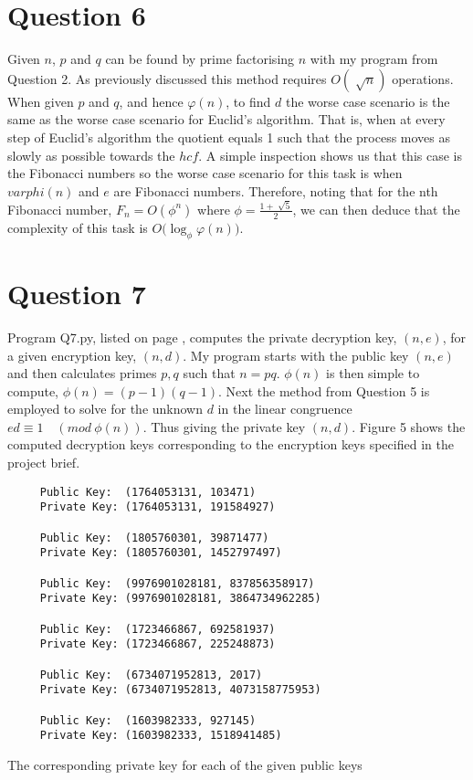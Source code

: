 \documentclass[a4paper]{article}
\begin{document}
\section*{Question 6}
Given $n$, $p$ and $q$ can be found by prime factorising $n$ with my program from Question 2. As previously discussed this method requires $O(\sqrt[]{n})$ operations.
\bigbreak
When given $p$ and $q$, and hence $\varphi(n)$, to find $d$ the worse case scenario is the same as the worse case scenario for Euclid's algorithm. That is, when at every step of Euclid's algorithm the quotient equals 1 such that the process moves as slowly as possible towards the $hcf$. A simple inspection shows us that this case is the Fibonacci numbers so the worse case scenario for this task is when $varphi(n)$ and $e$ are Fibonacci numbers. Therefore, noting that for the nth Fibonacci number, $F_n = O(\phi^n)$ where $\phi = \frac{1+\sqrt[]{5}}{2}$, we can then deduce that the complexity of this task is $O\big(\log_{\phi}\varphi(n)\big)$.

\section*{Question 7}
Program Q7.py, listed on page \pageref{PQ7}, computes the private decryption key, $(n,e)$, for a given encryption key, $(n,d)$. My program starts with the public key $(n,e)$ and then calculates primes $p,q$ such that $n=pq$. $\phi(n)$ is then simple to compute, $\phi(n) = (p-1)(q-1)$. Next the method from Question 5 is employed to solve for the unknown $d$ in the linear congruence $ed\equiv 1 \quad (mod\ \phi(n))$. Thus giving the private key $(n,d)$. Figure 5 shows the computed decryption keys corresponding to the encryption keys specified in the project brief.

\begin{table}[H]
\centering
\begin{verbatim}
     Public Key:  (1764053131, 103471)
     Private Key: (1764053131, 191584927) 
     
     Public Key:  (1805760301, 39871477)
     Private Key: (1805760301, 1452797497) 
     
     Public Key:  (9976901028181, 837856358917)
     Private Key: (9976901028181, 3864734962285) 
     
     Public Key:  (1723466867, 692581937)
     Private Key: (1723466867, 225248873) 
     
     Public Key:  (6734071952813, 2017)
     Private Key: (6734071952813, 4073158775953) 
     
     Public Key:  (1603982333, 927145)
     Private Key: (1603982333, 1518941485)
\end{verbatim}
\caption{The corresponding private key for each of the given public keys}
\end{table}
\end{document}
